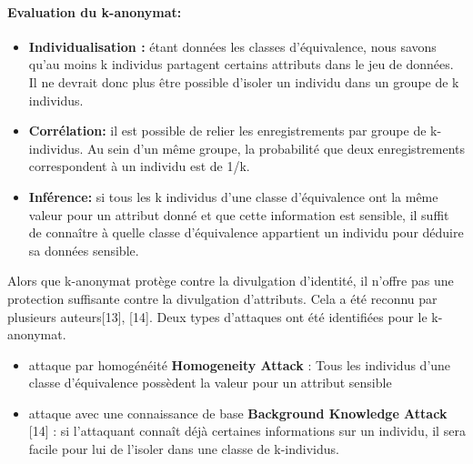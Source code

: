 \paragraph{Evaluation du k-anonymat:}  
\begin{itemize}
    \item \textbf{Individualisation :} étant données les classes d’équivalence, nous savons qu’au moins k individus partagent certains attributs dans le jeu de données. Il ne devrait donc plus être possible d’isoler un individu dans un groupe de k individus. 

    \item \textbf{Corrélation:} il est possible de relier les enregistrements par groupe de k-individus. Au sein d’un même groupe, la probabilité que deux enregistrements correspondent à un individu est de 1/k. 

    \item \textbf{Inférence:} si tous les k individus d’une classe d’équivalence ont la même valeur pour un attribut donné et que cette information est sensible, il suffit de connaître à quelle classe d’équivalence appartient un individu pour déduire sa données sensible. 
\end{itemize}
 
Alors que k-anonymat protège contre la divulgation d'identité, il n'offre pas une protection suffisante contre la divulgation d'attributs. Cela a été reconnu par plusieurs auteurs[13], [14]. Deux types d'attaques ont été identifiées pour le k-anonymat.
\begin{itemize}
    \item attaque par homogénéité \textbf{Homogeneity Attack} : Tous les individus d'une classe d'équivalence possèdent la valeur pour un attribut sensible
    \item  attaque avec une connaissance de base \textbf{Background Knowledge Attack} [14] : si l'attaquant connaît déjà certaines informations sur un individu, il sera facile pour lui de l'isoler dans une classe de k-individus. 
\end{itemize} 
